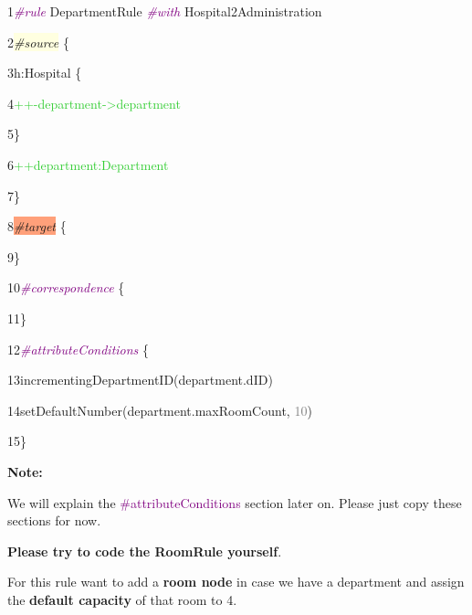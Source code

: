 {

1\hspace{0.5cm}\textcolor{Purple}{\textit{\#rule}} DepartmentRule \textcolor{Purple}{\textit{\#with}} Hospital2Administration

2\hspace{0.5cm}\colorbox{LightYellow}{\textit{\#source}} \{ 

3\hspace{1cm}h:Hospital \{

4\hspace{1.5cm}\hspace{1cm}\textcolor{LimeGreen}{++-department->department}

5\hspace{1cm}\}

6\hspace{1cm}\textcolor{LimeGreen}{++department:Department}

7\hspace{0.5cm}\}

8\hspace{0.5cm}\colorbox{LightSalmon}{\textit{\#target}} \{

9\hspace{0.5cm}\}

10\hspace{0.5cm}\textcolor{Purple}{\textit{\#correspondence}} \{

11\hspace{0.5cm}\}

12\hspace{0.5cm}\textcolor{Purple}{\textit{\#attributeConditions}} \{

13\hspace{1cm}incrementingDepartmentID(department.dID)

14\hspace{1cm}setDefaultNumber(department.maxRoomCount, \textcolor{Grey}{10})

15\hspace{0.5cm}\}\newline

}

\textbf{Note:}

We will explain the \textcolor{Purple}{\#attributeConditions} section later on. Please just copy these sections for now.\newline

\textbf{Please try to code the \textsf{RoomRule} yourself}.\newline

For this rule want to add a \textbf{room node} in case we have a department and assign the \textbf{default capacity} of that room to 4.

